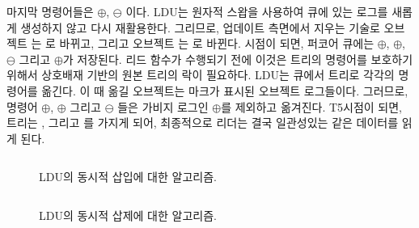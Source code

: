 마지막 명령어들은 $\oplus$, $\ominus$ 이다. 
LDU는 원자적 스왑을 사용하여 큐에 있는 로그를 새롭게 생성하지 않고 다시 재활용한다. 
그리므로, 업데이트 측면에서 지우는 기술로
 오브젝트 는 로 바뀌고, 그리고 오브젝트 는
로 바뀐다. 
 시점이 되면, 퍼코어 큐에는 $\oplus$, $\oplus$, $\ominus$ 
그리고 $\oplus$가 저장된다. 
리드 함수가 수행되기 전에 이것은 트리의 명령어를 보호하기 위해서
상호배재 기반의 원본 트리의 락이 필요하다. 
LDU는 큐에서 트리로 각각의 명령어를 옮긴다. 이 때 옮길 오브젝트는 마크가 표시된 
오브젝트 로그들이다.
그러므로, 명령어 $\oplus$, $\oplus$ 그리고 $\ominus$
들은 가비지 로그인 $\oplus$를 제외하고 옮겨진다. 
T5시점이 되면, 트리는 ,  그리고 를 가지게 되어, 
최종적으로 리더는 결국 일관성있는 같은 데이터를 읽게 된다. 

\begin{figure}[h]
\begin{center}
\inputminted[linenos,fontsize=\footnotesize, tabsize=4]{c}{src/ldu_logical_a.c}
\end{center}
\caption{LDU의 동시적 삽입에 대한 알고리즘.}
\label{fig:gldulogicalupdate}
\end{figure}


\begin{figure}[h]
\begin{center}
\inputminted[linenos,fontsize=\footnotesize, tabsize=4]{c}{src/ldu_logical_b.c}
\end{center}
\caption{LDU의 동시적 삽제에 대한 알고리즘.}
\label{fig:gldulogicalupdate}
\end{figure}


